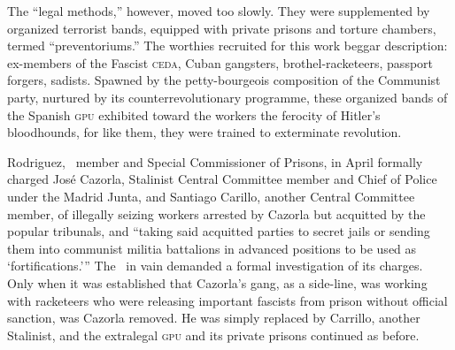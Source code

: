 The ``legal methods,'' however, moved too slowly. They were supplemented by organized terrorist bands, equipped with private prisons and torture chambers, termed ``preventoriums.'' The worthies recruited for this work beggar description: ex-members of the Fascist \textsc{ceda}, Cuban gangsters, brothel-racketeers, passport forgers, sadists. Spawned by the petty-bourgeois composition of the Communist party, nurtured by its counterrevolutionary programme, these organized bands of the Spanish \textsc{gpu} exhibited toward the workers the ferocity of Hitler’s bloodhounds, for like them, they were trained to exterminate revolution.

Rodriguez, \CNT\ member and Special Commissioner of Prisons, in April formally charged José Cazorla, Stalinist Central Committee member and Chief of Police under the Madrid Junta, and Santiago Carillo, another Central Committee member, of illegally seizing workers arrested by Cazorla but acquitted by the popular tribunals, and ``taking said acquitted parties to secret jails or sending them into communist militia battalions in advanced positions to be used as `fortifications.''' The \CNT\ in vain demanded a formal investigation of its charges. Only when it was established that Cazorla’s gang, as a side-line, was working with racketeers who were releasing important fascists from prison without official sanction, was Cazorla removed. He was simply replaced by Carrillo, another Stalinist, and the extralegal \textsc{gpu} and its private prisons continued as before.

